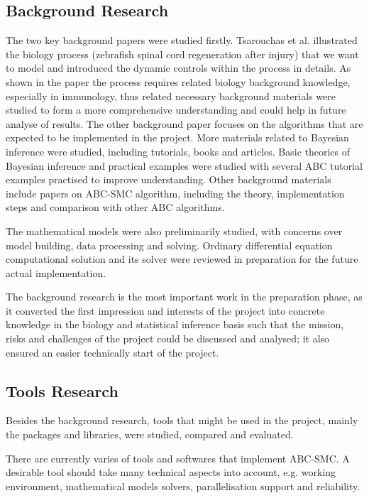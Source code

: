 \documentclass{article}
\begin{document}
\subsection{Background Research}

The two key background papers\cite{ref:Tsarouchas,ref:Liepe} were studied firstly. 
Tsarouchas et al.\cite{ref:Tsarouchas} illustrated 
the biology process (zebrafish spinal cord regeneration after injury) that we want to 
model and introduced the dynamic controls within the process in details. As 
shown in the paper the process requires related biology 
background knowledge, especially in immunology, thus related necessary background
materials were studied to form a more comprehensive understanding and could help in 
future analyse of results. The other background paper focuses on the algorithms that 
are expected to be implemented in the project. More materials related to Bayesian 
inference were studied, including tutorials, books and articles. Basic theories of 
Bayesian inference and practical examples were studied with several ABC tutorial examples 
practised to improve understanding. Other background materials include papers on 
ABC-SMC algorithm, including the theory, implementation steps and comparison with 
other ABC algorithms.

The mathematical models were also preliminarily studied, with concerns over model 
building, data processing and solving. Ordinary differential equation computational 
solution and its solver were reviewed in preparation for the future actual 
implementation.

The background research is the most important work in the preparation phase, 
as it converted the first impression and interests of the project into concrete 
knowledge in the biology and statistical inference basis such that the mission, 
risks and challenges of the project could be discussed and analysed; it also 
ensured an easier technically start of the project.

\subsection{Tools Research}
Besides the background research, tools that might be used in the project, mainly 
the packages and libraries, were studied, compared and evaluated.

There are currently varies of tools and softwares that implement ABC-SMC. A desirable tool should take many technical aspects into account, e.g. working environment, mathematical models solvers, parallelisation support and reliability.
\end{document}
